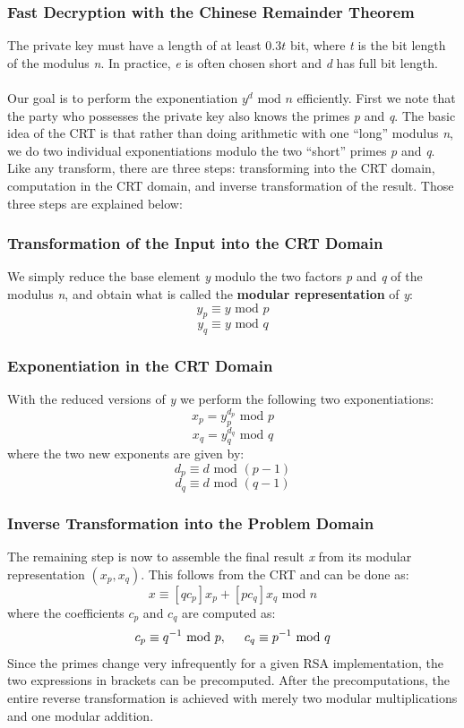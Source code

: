 \documentclass[11pt, a4paper]{article}
\newcommand{\doublequotes}[1]{“#1”}
\newcommand{\mymod}{
    \text{ mod }
}
\begin{document}
\subsubsection{Fast Decryption with the Chinese Remainder Theorem}
The private key must have a length of at least $0.3t$ bit, where \textit{t} is the bit length of the modulus \textit{n}. In practice, \textit{e} is often chosen short and \textit{d} has full bit length.\\\\
Our goal is to perform the exponentiation $y^d\mymod n$ efficiently. First we note that the party who possesses the private key also knows the primes \textit{p} and \textit{q}. The basic idea of the CRT is that rather than doing arithmetic with one \doublequotes{long} modulus \textit{n}, we do two individual exponentiations modulo the two \doublequotes{short} primes \textit{p} and \textit{q}. Like any transform, there are three steps: transforming into the CRT domain, computation in the CRT domain, and inverse transformation of the result. Those three steps are explained below:
\subsubsection*{Transformation of the Input into the CRT Domain}
We simply reduce the base element \textit{y} modulo the two factors \textit{p} and \textit{q} of the modulus \textit{n}, and obtain what is called the \textbf{modular representation} of \textit{y}:
$$y_p\equiv y\mymod p$$
$$y_q\equiv y\mymod q$$
\subsubsection*{Exponentiation in the CRT Domain}
With the reduced versions of \textit{y} we perform the following two exponentiations:
$$x_p=y_p^{d_p}\mymod p$$
$$x_q=y_q^{d_q}\mymod q$$
where the two new exponents are given by:
$$d_p\equiv d\mymod(p-1)$$
$$d_q\equiv d\mymod(q-1)$$

\newpage
\subsubsection*{Inverse Transformation into the Problem Domain}
The remaining step is now to assemble the final result \textit{x} from its modular representation $(x_p,x_q)$. This follows from the CRT and can be done as:
$$x\equiv [qc_p]x_p + [pc_q]x_q\mymod n$$
where the coefficients $c_p$ and $c_q$ are computed as:
$$c_p\equiv q^{-1}\mymod p,\hspace{0.5cm}c_q\equiv p^{-1}\mymod q$$
Since the primes change very infrequently for a given RSA implementation, the two expressions in brackets can be precomputed. After the precomputations, the entire reverse transformation is achieved with merely two modular multiplications and one modular addition.\\
\end{document}
